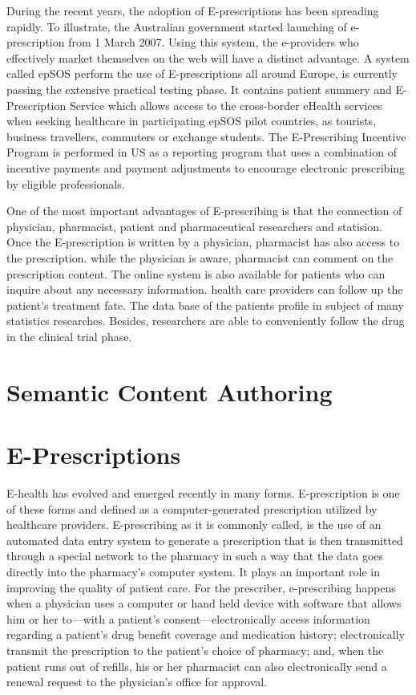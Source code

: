 \documentclass[10pt, conference, compsocconf]{IEEEtran}
\begin{document}
During the recent years, the adoption of E-prescriptions has been spreading rapidly.
To illustrate, the Australian government started launching of e-prescription from 1 March 2007.
Using this system, the e-providers who effectively market themselves on the web will have a distinct advantage\cite{Ravichandran}.
A system called epSOS perform the use of E-prescriptions all around Europe, is currently passing the extensive practical testing phase.
It contains patient summery and E-Prescription Service which allows access to the cross-border eHealth services when seeking healthcare in participating epSOS pilot countries, as tourists, business travellers, commuters or exchange students.
The E-Prescribing Incentive Program is performed in US as a reporting program that uses a combination of incentive payments and payment adjustments to encourage electronic prescribing by eligible professionals.

One of the most important advantages of E-prescribing is that the connection of physician, pharmacist, patient and pharmaceutical researchers and statision.
Once the E-prescription is written by a physician, pharmacist has also access to the prescription.
while the physician is aware, pharmacist can comment on the prescription content.
The online system is also available for patients who can inquire about any necessary information.
health care providers can follow up the patient's treatment fate.
The data base of the patients profile in subject of many statistics researches.
Besides, researchers are able to conveniently follow the drug in the clinical trial phase.



\section{Semantic Content Authoring}
\label{sec:sca}

\section{E-Prescriptions}
\label{epresc}
E-health has evolved and emerged recently in many forms.
E-prescription is one of these forms and defined as a computer-generated prescription utilized by healthcare providers.
E-prescribing as it is commonly called, is the use of an automated data entry system to generate a prescription that is then transmitted through a special network to the pharmacy in such a way that the data goes directly into the pharmacy’s computer system.
It plays an important role in improving the quality of patient care.
For the prescriber, e-prescribing happens when a physician uses a computer or hand held device with software that allows him or her to—with a patient’s consent—electronically access information regarding a patient’s drug benefit coverage and medication history; electronically transmit the prescription to the patient’s choice of pharmacy; and, when the patient runs out of refills, his or her pharmacist can also electronically send a renewal request to the physician’s office for approval.
\end{document}
